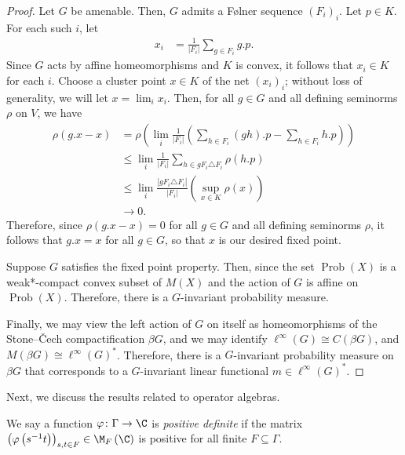 \documentclass[10pt]{mypackage}
\begin{document}
\begin{proof}
  Let $G$ be amenable. Then, $G$ admits a Følner sequence $\left( F_i \right)_i$. Let $p\in K$. For each such $i$, let
  \begin{align*}
    x_i &= \frac{1}{\left\vert F_i \right\vert} \sum_{g\in F_i} g.p.
  \end{align*}
  Since $G$ acts by affine homeomorphisms and $K$ is convex, it follows that $x_i\in K$ for each $i$. Choose a cluster point $x\in K$ of the net $\left( x_i \right)_i$; without loss of generality, we will let $x = \lim_{i}x_i$. Then, for all $g\in G$ and all defining seminorms $\rho$ on $V$, we have
  \begin{align*}
    \rho\left( g.x-x \right) &= \rho\left( \lim_{i} \frac{1}{\left\vert F_i \right\vert} \left( \sum_{h\in F_i} \left( gh \right).p - \sum_{h\in F_i}h.p \right) \right)\\
                             &\leq \lim_{i} \frac{1}{\left\vert F_i \right\vert} \sum_{h\in gF_i\triangle F_i} \rho\left( h.p \right)\\
                             &\leq \lim_{i} \frac{\left\vert gF_i\triangle F_i \right\vert}{\left\vert F_i \right\vert} \left( \sup_{x\in K} \rho(x) \right)\\
                             &\rightarrow 0.
  \end{align*}
  Therefore, since $\rho\left( g.x -x\right) = 0$ for all $g\in G$ and all defining seminorms $\rho$, it follows that $g.x = x$ for all $g\in G$, so that $x$ is our desired fixed point.

  Suppose $G$ satisfies the fixed point property. Then, since the set $\operatorname{Prob}\left( X \right)$ is a weak*-compact convex subset of $M(X)$ and the action of $G$ is affine on $\operatorname{Prob}(X)$. Therefore, there is a $G$-invariant probability measure.

  Finally, we may view the left action of $G$ on itself as homeomorphisms of the Stone--\v{C}ech compactification $\beta G$, and we may identify $\ell^{\infty}\left( G \right)\cong C\left( \beta G \right)$, and $M\left( \beta G \right) \cong \ell^{\infty}\left( G \right)^{\ast}$. Therefore, there is a $G$-invariant probability measure on $\beta G$ that corresponds to a $G$-invariant linear functional $m\in \ell^{\infty}\left( G \right)^{\ast}$.
\end{proof}
Next, we discuss the results related to operator algebras.
\begin{definition}
  We say a function $\varphi\colon \Gamma\to\C$ is \textit{positive definite} if the matrix $\left( \varphi\left( s^{-1}t \right) \right)_{s,t\in F}\in \M_{F}\left( \C \right)$ is positive for all finite $F\subseteq \Gamma$.
\end{definition}
\end{document}
